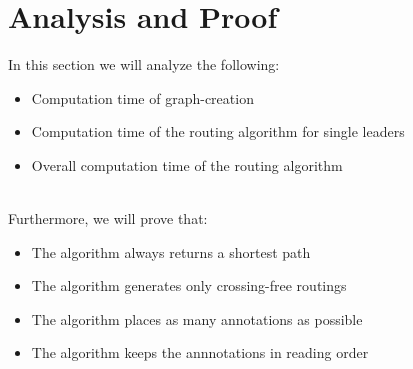 \documentclass[11pt,a4paper]{vutinfth}
\begin{document}
\section{Analysis and Proof}

In this section we will analyze the following:

\begin{itemize}
 \item Computation time of graph-creation
 \item Computation time of the routing algorithm for single leaders
 \item Overall computation time of the routing algorithm
\end{itemize}
~\\
Furthermore, we will prove that:
\begin{itemize}
\item The algorithm always returns a shortest path
\item The algorithm generates only crossing-free routings
\item The algorithm places as many annotations as possible
\item The algorithm keeps the annnotations in reading order
\end{itemize}

%
%
%
% 
\end{document}
